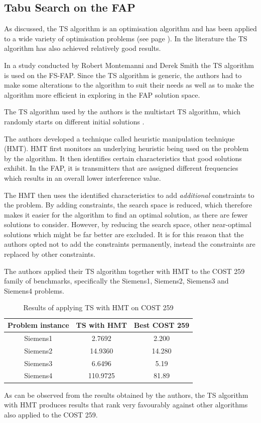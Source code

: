 \subsection{Tabu Search on the FAP}
As discussed, the TS algorithm is an optimisation algorithm and has been applied to a wide variety of optimisation problems (see page \pageref{sec:TSIntroduction}). In the literature the TS algorithm has also achieved relatively good results.

In a study conducted by Robert Montemanni and Derek Smith \cite{TabuMontemanniSmith} the TS algorithm is used on the FS-FAP. Since the TS algorithm is generic, the authors had to make some alterations to the algorithm to suit their needs as well as to make the algorithm more efficient in exploring in the FAP solution space.

The TS algorithm used by the authors is the multistart TS algorithm, which randomly starts on different initial solutions \cite{TabuMontemanniSmith}.

The authors developed a technique called heuristic manipulation technique (HMT). HMT first monitors an underlying heuristic being used on the problem by the algorithm\cite{TabuMontemanniSmith}. It then identifies certain characteristics that good solutions exhibit. In the FAP, it is transmitters that are assigned different frequencies which results in an overall lower interference value\cite{TabuMontemanniSmith}.

The HMT then uses the identified characteristics to add \emph{additional} constraints to the problem\cite{TabuMontemanniSmith}. By adding constraints, the search space is reduced, which therefore makes it easier for the algorithm to find an optimal solution, as there are fewer solutions to consider. However, by reducing the search space, other near-optimal solutions which might be far better are excluded\cite{TabuMontemanniSmith}. It is for this reason that the authors opted not to add the constraints permanently, instead the constraints are replaced by other constraints\cite{TabuMontemanniSmith}.

The authors applied their TS algorithm together with HMT to the COST 259 family of benchmarks, specifically the Siemens1, Siemens2, Siemens3 and Siemens4 problems.
\begin{table}
\centering
	\begin{tabular}{| c | c | c |}
		\hline
		Problem instance & TS with HMT & Best COST 259 \\ \hline
		Siemens1 & 2.7692 & 2.200 \\ \hline
		Siemens2 & 14.9360 & 14.280 \\ \hline
		Siemens3 & 6.6496 & 5.19 \\ \hline
		Siemens4 & 110.9725 & 81.89 \\ \hline
	\end{tabular}
\caption{Results of applying TS with HMT on COST 259}
\end{table}
As can be observed from the results obtained by the authors, the TS algorithm with HMT produces results that rank very favourably against other algorithms also applied to the COST 259.

